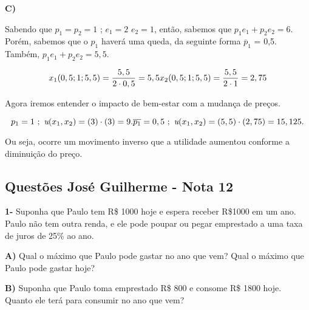 \begin{flushleft}
\singlespacing

\textbf{C)}

Sabendo que $p_{1} = p_{2} = 1$ ; $\textit{e}_{1} = 2$  $\textit{e}_{2} = 1$, então, sabemos que $p_{1}\textit{e}_{1} + p_{2}\textit{e}_{2} = 6$. Porém, sabemos que o $p_{1}$ haverá uma queda, da seguinte forma $\overline{p}_{1}$ = 0,5. Também, $p_{1}\textit{e}_{1} + p_{2}\textit{e}_{2} = 5,5$.

\begin{equation}
x_{1}(0,5;1;5,5) = \dfrac{5,5}{2 \cdot 0,5} = 5,5
$$\\$$
x_{2}(0,5;1;5,5) = \dfrac{5,5}{2 \cdot 1} = 2,75
\end{equation}

\begin{center}
	Agora iremos entender o impacto de bem-estar com a mudança de preços.
\end{center}

\begin{equation}
p_{1} = 1 \ ; \ \textit{u}(x_{1}, x_{2}) = (3) \cdot (3) = 9. 
$$\\$$
\overline{p_{1}} = 0,5 \ ; \ \textit{u}(x_{1}, x_{2}) = (5,5) \cdot (2,75) = 15,125.
\end{equation}

\begin{center}
	Ou seja, ocorre um movimento inverso que a utilidade aumentou conforme a diminuição do preço.
\end{center}

\begin{center}
	\section*{Questões José Guilherme - Nota 12}
\end{center}

\singlespacing

\textbf{1- } Suponha que Paulo tem R\$ 1000 hoje e espera receber R\$1000 em um ano. Paulo não tem outra renda, e ele pode poupar ou pegar emprestado a uma taxa de juros de 25\% ao ano.

\singlespacing

\textbf{A)} Qual o máximo que Paulo pode gastar no ano que vem? Qual o máximo que Paulo pode gastar hoje?

\singlespacing

\textbf{B)} Suponha que Paulo toma emprestado R\$ 800 e consome R\$ 1800 hoje. Quanto ele terá para consumir no ano que vem?


\end{flushleft}

